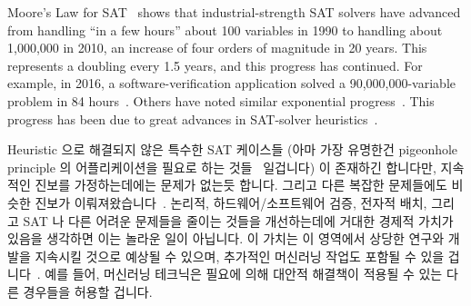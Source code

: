 Moore's Law for SAT~\cite[Fig.~2.3]{Kroening:2008:DPA:1391237} shows
that industrial-strength SAT solvers have advanced from handling
``in a few hours'' about
100 variables in 1990 to handling about 1,000,000 in 2010, an increase
of four orders of magnitude in 20 years.
This represents a doubling every 1.5 years, and this progress has
continued.
For example, in 2016, a software-verification application solved a
90,000,000-variable problem in 84 hours~\cite{LihaoLiang2016VerifyTreeRCU}.
Others have noted similar exponential
progress~\cite{SharadMalik2010SATSolverHistory,SATCompetition2002,vanHarmelen:2007:HKR:1557461,Malik:2009:BST:1536616.1536637,JamesEzick2014ExtremeSAT}.
This progress has been due to great advances in SAT-solver
heuristics~\cite{Kroening:2008:DPA:1391237,Zhang:2002:QEB:647771.734434,SharadMalik2010SATSolverHistory,Malik:2009:BST:1536616.1536637,Audemard:2009:PLC:1661445.1661509}.
\fi

Heuristic 으로 해결되지 않은 특수한 SAT 케이스들 (아마 가장 유명한건 pigeonhole
principle 의 어플리케이션을 필요로 하는
것들~\cite[page~38]{Kroening:2008:DPA:1391237} 일겁니다) 이 존재하긴 합니다만,
지속적인 진보를 가정하는데에는 문제가 없는듯 합니다.
그리고 다른 복잡한 문제들에도 비슷한 진보가
이뤄져왔습니다~\cite{WikipediaPrimalityTest,WikipediaTSP,WikipediaIntegerFactorization}.
논리적, 하드웨어/소프트웨어 검증, 전자적 배치, 그리고 SAT 나 다른 어려운
문제들을 줄이는 것들을 개선하는데에 거대한 경제적 가치가 있음을 생각하면 이는
놀라운 일이 아닙니다.
이 가치는 이 영역에서 상당한 연구와 개발을 지속시킬 것으로 예상될 수 있으며,
추가적인 머신러닝 작업도 포함될 수 있을
겁니다~\cite{ShaiHaim2009SAT-MachineLearning}.
예를 들어, 머신러닝 테크닉은 필요에 의해 대안적 해결책이 적용될 수 있는 다른
경우들을 허용할 겁니다.

